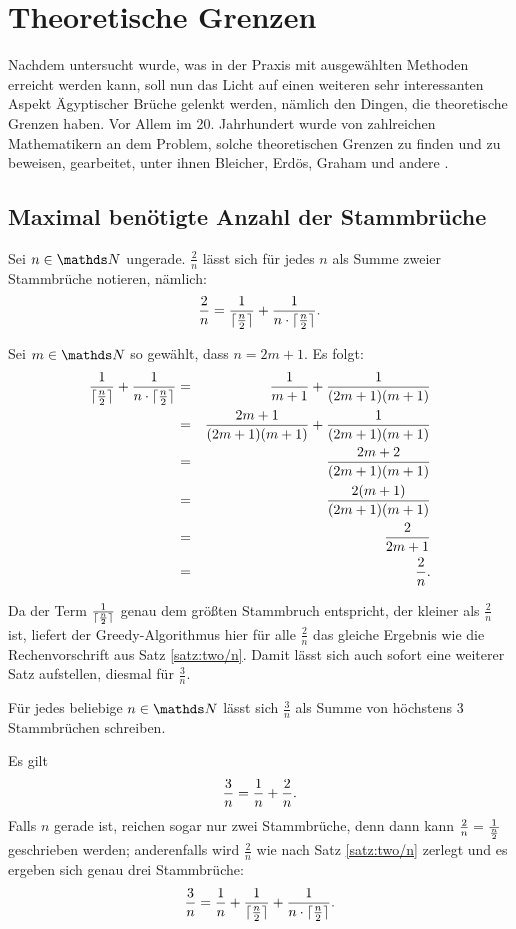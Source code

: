 \section{Theoretische Grenzen}\label{sec:theorie}
Nachdem untersucht wurde, was in der Praxis mit ausgewählten Methoden erreicht werden kann, soll nun das Licht auf einen weiteren sehr interessanten Aspekt Ägyptischer Brüche gelenkt werden, nämlich den Dingen, die theoretische Grenzen haben. Vor Allem im 20. Jahrhundert wurde von zahlreichen Mathematikern an dem Problem, solche theoretischen Grenzen zu finden und zu beweisen, gearbeitet, unter ihnen Bleicher, Erdös, Graham und andere \cite[S.87 ff]{Guy1981}.

\subsection{Maximal benötigte Anzahl der Stammbrüche}
\begin{satz}\label{satz:two/n}
	Sei $n \in \N$ ungerade. $\frac{2}{n}$ lässt sich für jedes $n$ als Summe zweier Stammbrüche notieren, nämlich:
	$$\frac{2}{n} = \frac{1}{\lceil \frac{n}{2} \rceil} + \frac{1}{n \cdot \lceil \frac{n}{2} \rceil}.$$
\end{satz}
\begin{bew}
	Sei $m \in \N$ so gewählt, dass $n=2m+1$. Es folgt:
	\begin{eqnarray*}
		\frac{1}{\lceil \frac{n}{2} \rceil} + \frac{1}{n \cdot \lceil \frac{n}{2} \rceil} & = & \frac{1}{m+1} + \frac{1}{(2m+1)(m+1)}\\
		& = & \frac{2m+1}{(2m+1)(m+1)} + \frac{1}{(2m+1)(m+1)}\\
		& = & \frac{2m+2}{(2m+1)(m+1)}\\
		& = & \frac{2(m+1)}{(2m+1)(m+1)}\\
		& = & \frac{2}{2m+1}\\
		& = & \frac{2}{n}.
	\end{eqnarray*}
\end{bew}

Da der Term $\frac{1}{\lceil \frac{n}{2} \rceil}$ genau dem größten Stammbruch entspricht, der kleiner als $\frac{2}{n}$ ist, liefert der Greedy-Algorithmus hier für alle $\frac{2}{n}$ das gleiche Ergebnis wie die Rechenvorschrift aus Satz \ref{satz:two/n}. Damit lässt sich auch sofort eine weiterer Satz aufstellen, diesmal für $\frac{3}{n}$.

\begin{satz}
	Für jedes beliebige $n \in \N$ lässt sich $\frac{3}{n}$ als Summe von höchstens 3 Stammbrüchen schreiben.
\end{satz}
\begin{bew}
	Es gilt
	$$\frac{3}{n} = \frac{1}{n} + \frac{2}{n}.$$
	Falls $n$ gerade ist, reichen sogar nur zwei Stammbrüche, denn dann kann $\frac{2}{n} = \frac{1}{\frac{n}{2}}$ geschrieben werden; anderenfalls wird $\frac{2}{n}$ wie nach Satz \ref{satz:two/n} zerlegt und es ergeben sich genau drei Stammbrüche:
	$$\frac{3}{n} = \frac{1}{n} + \frac{1}{\lceil \frac{n}{2} \rceil} + \frac{1}{n \cdot \lceil \frac{n}{2} \rceil}.$$
\end{bew}